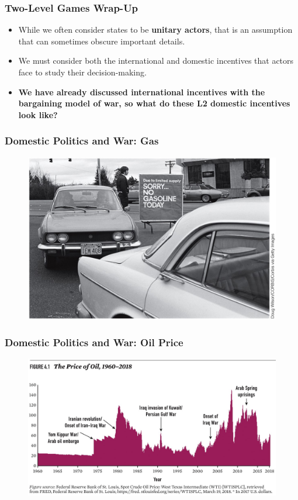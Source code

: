 \documentclass[handout]{beamer}
\begin{document}
\begin{frame} 
	\frametitle{\LARGE{Two-Level Games Wrap-Up}}
	\begin{itemize}
		\item While we often consider states to be \textbf{unitary actors}, that is an assumption that can sometimes obscure important details. \pause
		\item We must consider both the international and domestic incentives that actors face to study their decision-making. \pause
		\item\textbf{We have already discussed international incentives with the bargaining model of war, so what do these L2 domestic incentives look like?}
	\end{itemize}
\end{frame}


\begin{frame} 
	\frametitle{\LARGE{Domestic Politics and War: Gas}}
	\begin{figure}[ht!]
		\centering
		\includegraphics[width=\textwidth,height=0.9\textheight,keepaspectratio]{Gasshort.jpg}
	\end{figure}
\end{frame}

\begin{frame} 
	\frametitle{\LARGE{Domestic Politics and War: Oil Price}}
	\begin{figure}[ht!]
		\centering
		\includegraphics[width=\textwidth,height=0.9\textheight,keepaspectratio]{Oilpricewar.jpg}
	\end{figure}
\end{frame}
\end{document}

